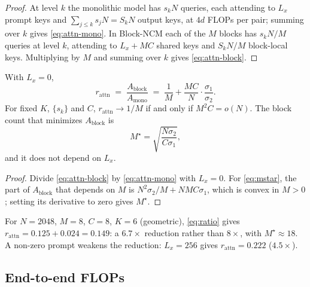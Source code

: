 \begin{proof}
At level $k$ the monolithic model has $s_kN$ queries, each attending to $L_x$
prompt keys and $\sum_{j\le k}s_jN=S_kN$ output keys, at $4d$ FLOPs per pair;
summing over $k$ gives \eqref{eq:attn-mono}. In Block-NCM each of the $M$
blocks has $s_kN/M$ queries at level $k$, attending to $L_x+MC$ shared keys and
$S_kN/M$ block-local keys. Multiplying by $M$ and summing over $k$ gives
\eqref{eq:attn-block}.
\end{proof}

\begin{corollary}
\label{cor:ratio}
With $L_x=0$,
\begin{equation}
  r_{\mathrm{attn}}
  \;=\;\frac{A_{\mathrm{block}}}{A_{\mathrm{mono}}}
  \;=\;\frac1M+\frac{MC}{N}\cdot\frac{\sigma_1}{\sigma_2}.
  \label{eq:ratio}
\end{equation}
For fixed $K$, $\{s_k\}$ and $C$, $r_{\mathrm{attn}}\to 1/M$ if and only if
$M^2C=o(N)$. The block count that minimizes $A_{\mathrm{block}}$ is
\begin{equation}
  M^\star=\sqrt{\frac{N\sigma_2}{C\sigma_1}},
  \label{eq:mstar}
\end{equation}
and it does not depend on $L_x$.
\end{corollary}

\begin{proof}
Divide \eqref{eq:attn-block} by \eqref{eq:attn-mono} with $L_x=0$. For
\eqref{eq:mstar}, the part of $A_{\mathrm{block}}$ that depends on $M$ is
$N^2\sigma_2/M+NMC\sigma_1$, which is convex in $M>0$; setting its derivative
to zero gives $M^\star$.
\end{proof}

For $N=2048$, $M=8$, $C=8$, $K=6$ (geometric), \eqref{eq:ratio} gives
$r_{\mathrm{attn}}=0.125+0.024=0.149$: a $6.7\times$ reduction rather than
$8\times$, with $M^\star\approx18$. A non-zero prompt weakens the reduction:
$L_x=256$ gives $r_{\mathrm{attn}}=0.222$ ($4.5\times$).

\subsection{End-to-end FLOPs}

